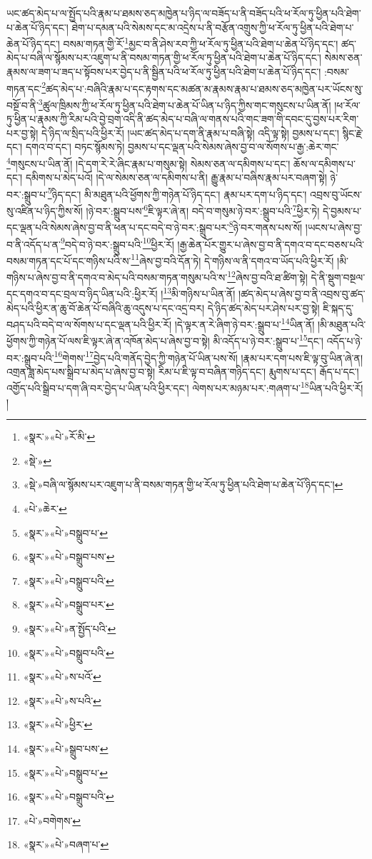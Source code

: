 ཡང་ཚད་མེད་པ་ལ་སྤྱོད་པའི་རྣམ་པ་ཐམས་ཅད་མཁྱེན་པ་ཉིད་ལ་བཟོད་པ་ནི་བཟོད་པའི་ཕ་རོལ་ཏུ་ཕྱིན་པའི་ཐེག་པ་ཆེན་པོ་ཉིད་དང་། ཐེག་པ་དམན་པའི་སེམས་དང་མ་འདྲེས་པ་ནི་བརྩོན་འགྲུས་ཀྱི་ཕ་རོལ་ཏུ་ཕྱིན་པའི་ཐེག་པ་ཆེན་པོ་ཉིད་དང་། བསམ་གཏན་གྱི་རོ་\footnote{«སྣར་»«པེ་»རོ་མི་}མྱང་བ་ནི་ཤེས་རབ་ཀྱི་ཕ་རོལ་ཏུ་ཕྱིན་པའི་ཐེག་པ་ཆེན་པོ་ཉིད་དང་། ཚད་མེད་པ་བཞི་ལ་སྙོམས་པར་འཇུག་པ་ནི་བསམ་གཏན་གྱི་ཕ་རོལ་ཏུ་ཕྱིན་པའི་ཐེག་པ་ཆེན་པོ་ཉིད་དང་། སེམས་ཅན་རྣམས་ལ་ཟག་པ་ཟད་པ་སྟོབས་པར་བྱེད་པ་ནི་སྦྱིན་པའི་ཕ་རོལ་ཏུ་ཕྱིན་པའི་ཐེག་པ་ཆེན་པོ་ཉིད་དང་། :བསམ་གཏན་དང་\footnote{«སྡེ་»}ཚད་མེད་པ་:བཞིའི་རྣམ་པ་དང་རྟགས་དང་མཚན་མ་རྣམས་རྣམ་པ་ཐམས་ཅད་མཁྱེན་པར་ཡོངས་སུ་བསྔོ་བ་ནི་\footnote{«སྡེ་»བཞི་ལ་སྙོམས་པར་འཇུག་པ་ནི་བསམ་གཏན་གྱི་ཕ་རོལ་ཏུ་ཕྱིན་པའི་ཐེག་པ་ཆེན་པོ་ཉིད་དང་། }ཚུལ་ཁྲིམས་ཀྱི་ཕ་རོལ་ཏུ་ཕྱིན་པའི་ཐེག་པ་ཆེན་པོ་ཡིན་པ་ཉིད་ཀྱིས་གང་གསུངས་པ་ཡིན་ནོ། །ཕ་རོལ་ཏུ་ཕྱིན་པ་རྣམས་ཀྱི་རིམ་པའི་བྱེ་བྲག་འདི་ནི་ཚད་མེད་པ་བཞི་ལ་གནས་པའི་གང་ཟག་གི་དབང་དུ་བྱས་པར་རིག་པར་བྱ་སྟེ། དེ་ཉིད་ལ་སྲིད་པའི་ཕྱིར་རོ། །ཡང་ཚད་མེད་པ་དག་ནི་རྣམ་པ་བཞི་སྟེ། འདི་ལྟ་སྟེ། བྱམས་པ་དང་། སྙིང་རྗེ་དང་། དགའ་བ་དང་། བཏང་སྙོམས་ཏེ། བྱམས་པ་དང་ལྡན་པའི་སེམས་ཞེས་བྱ་བ་ལ་སོགས་པ་རྒྱ་:ཆེར་གང་\footnote{«པེ་»ཆེར་}གསུངས་པ་ཡིན་ནོ། །དེ་དག་རེ་རེ་ཞིང་རྣམ་པ་གསུམ་སྟེ། སེམས་ཅན་ལ་དམིགས་པ་དང་། ཆོས་ལ་དམིགས་པ་དང་། དམིགས་པ་མེད་པའོ། །དེ་ལ་སེམས་ཅན་ལ་དམིགས་པ་ནི། རྒྱུ་རྣམ་པ་བཞིས་རྣམ་པར་བཞག་སྟེ། ཉེ་བར་:སྒྲུབ་པ་\footnote{«སྣར་»«པེ་»བསྒྲུབ་པ་}ཉིད་དང་། མི་མཐུན་པའི་ཕྱོགས་ཀྱི་གཉེན་པོ་ཉིད་དང་། རྣམ་པར་དག་པ་ཉིད་དང་། འབྲས་བུ་ཡོངས་སུ་འཛིན་པ་ཉིད་ཀྱིས་སོ། །ཉེ་བར་:སྒྲུབ་པས་\footnote{«སྣར་»«པེ་»བསྒྲུབ་པས་}ཇི་ལྟར་ཞེ་ན། བདེ་བ་གསུམ་ཉེ་བར་:སྒྲུབ་པའི་\footnote{«སྣར་»«པེ་»བསྒྲུབ་པའི་}ཕྱིར་ཏེ། དེ་བྱམས་པ་དང་ལྡན་པའི་སེམས་ཞེས་བྱ་བ་ནི་ཕན་པ་དང་བདེ་བ་ཉེ་བར་:སྒྲུབ་པར་\footnote{«སྣར་»«པེ་»བསྒྲུབ་པར་}ཉེ་བར་གནས་པས་སོ། །ཡངས་པ་ཞེས་བྱ་བ་ནི་འདོད་པ་ན་\footnote{«སྣར་»«པེ་»ན་སྤྱོད་པའི་}བདེ་བ་ཉེ་བར་:སྒྲུབ་པའི་\footnote{«སྣར་»«པེ་»བསྒྲུབ་པའི་}ཕྱིར་རོ། །རྒྱ་ཆེན་པོར་གྱུར་པ་ཞེས་བྱ་བ་ནི་དགའ་བ་དང་བཅས་པའི་བསམ་གཏན་དང་པོ་དང་གཉིས་པའི་ས་\footnote{«སྣར་»«པེ་»ས་པའོ་}ཞེས་བྱ་བའི་དོན་ཏེ། དེ་གཉིས་ལ་ནི་དགའ་བ་ཡོད་པའི་ཕྱིར་རོ། །མི་གཉིས་པ་ཞེས་བྱ་བ་ནི་དགའ་བ་མེད་པའི་བསམ་གཏན་གསུམ་པའི་ས་\footnote{«སྣར་»«པེ་»ས་པའི་}ཞེས་བྱ་བའི་ཐ་ཚིག་སྟེ། དེ་ནི་སྡུག་བསྔལ་དང་དགའ་བ་དང་བྲལ་བ་ཉིད་ཡིན་པའི་:ཕྱིར་རོ། །\footnote{«སྣར་»«པེ་»ཕྱིར་}མི་གཉིས་པ་ཡིན་ནོ། །ཚད་མེད་པ་ཞེས་བྱ་བ་ནི་འབྲས་བུ་ཚད་མེད་པའི་ཕྱིར་ན་ཆུ་བོ་ཆེན་པོ་བཞིའི་ཆུ་འདུས་པ་དང་འདྲ་བར། དེ་ཉིད་ཚད་མེད་པར་ཤེས་པར་བྱ་སྟེ། ཇི་སྐད་དུ་བཤད་པའི་བདེ་བ་ལ་སོགས་པ་དང་ལྡན་པའི་ཕྱིར་རོ། །དེ་ལྟར་ན་རེ་ཞིག་ཉེ་བར་:སྒྲུབ་པ་\footnote{«སྣར་»«པེ་»སྒྲུབ་པས་}ཡིན་ནོ། །མི་མཐུན་པའི་ཕྱོགས་ཀྱི་གཉེན་པོ་ལས་ཇི་ལྟར་ཞེ་ན་འཁོན་མེད་པ་ཞེས་བྱ་བ་སྟེ། མི་འདོད་པ་ཉེ་བར་:སྒྲུབ་པ་\footnote{«སྣར་»«པེ་»བསྒྲུབ་པ་}དང་། འདོད་པ་ཉེ་བར་:སྒྲུབ་པའི་\footnote{«སྣར་»«པེ་»བསྒྲུབ་པའི་}གེགས་\footnote{«པེ་»བགེགས་}བྱེད་པའི་གནོད་བྱེད་ཀྱི་གཉེན་པོ་ཡིན་པས་སོ། །རྣམ་པར་དག་པས་ཇི་ལྟ་བུ་ཡིན་ཞེ་ན། འགྲན་ཟླ་མེད་པས་སྒྲིབ་པ་མེད་པ་ཞེས་བྱ་བ་སྟེ། རིམ་པ་ཇི་ལྟ་བ་བཞིན་གཉིད་དང་། རྨུགས་པ་དང་། རྒོད་པ་དང་། འགྱོད་པའི་སྒྲིབ་པ་དག་ཞི་བར་བྱེད་པ་ཡིན་པའི་ཕྱིར་དང་། ལེགས་པར་མཉམ་པར་:གཞག་པ་\footnote{«སྣར་»«པེ་»བཞག་པ་}ཡིན་པའི་ཕྱིར་རོ། །
